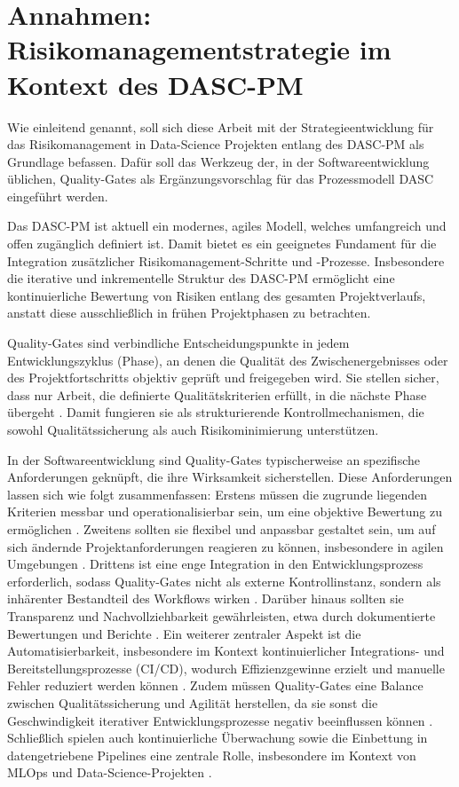\section{Annahmen: Risikomanagementstrategie im Kontext des DASC-PM}

Wie einleitend genannt, soll sich diese Arbeit mit der Strategieentwicklung für das Risikomanagement in Data-Science Projekten 
entlang des DASC-PM als Grundlage befassen.
Dafür soll das Werkzeug der, in der Softwareentwicklung üblichen, Quality-Gates als Ergänzungsvorschlag für das Prozessmodell 
DASC eingeführt werden.

Das DASC-PM ist aktuell ein modernes, agiles Modell, welches umfangreich und offen zugänglich definiert ist.
Damit bietet es ein geeignetes Fundament für die Integration zusätzlicher Risikomanagement-Schritte und -Prozesse.
Insbesondere die iterative und inkrementelle Struktur des DASC-PM ermöglicht eine kontinuierliche Bewertung von Risiken entlang 
des gesamten Projektverlaufs, anstatt diese ausschließlich in frühen Projektphasen zu betrachten.

Quality-Gates sind verbindliche Entscheidungspunkte in jedem Entwicklungszyklus (Phase), 
an denen die Qualität des Zwischenergebnisses oder des Projektfortschritts objektiv geprüft und freigegeben wird. 
Sie stellen sicher, dass nur Arbeit, die definierte Qualitätskriterien erfüllt, in die nächste Phase übergeht \citep{temole_integrated_2025}.
Damit fungieren sie als strukturierende Kontrollmechanismen, die sowohl Qualitätssicherung als auch Risikominimierung unterstützen.

In der Softwareentwicklung sind Quality-Gates typischerweise an spezifische Anforderungen geknüpft, die ihre Wirksamkeit sicherstellen.
Diese Anforderungen lassen sich wie folgt zusammenfassen:
Erstens müssen die zugrunde liegenden Kriterien messbar und operationalisierbar sein, um eine objektive Bewertung zu ermöglichen \citep{uzunova_quality_2024, paul_integrating_2025}.
Zweitens sollten sie flexibel und anpassbar gestaltet sein, um auf sich ändernde Projektanforderungen reagieren zu können, insbesondere in agilen Umgebungen \citep{uzunova_quality_2024}.
Drittens ist eine enge Integration in den Entwicklungsprozess erforderlich, sodass Quality-Gates nicht als externe Kontrollinstanz, 
sondern als inhärenter Bestandteil des Workflows wirken \citep{paul_integrating_2025}.
Darüber hinaus sollten sie Transparenz und Nachvollziehbarkeit gewährleisten, etwa durch dokumentierte Bewertungen und Berichte \citep{uzunova_quality_2024}.
Ein weiterer zentraler Aspekt ist die Automatisierbarkeit, insbesondere im Kontext kontinuierlicher Integrations- und 
Bereitstellungsprozesse (CI/CD), wodurch Effizienzgewinne erzielt und manuelle Fehler reduziert werden können \citep{paul_integrating_2025}.
Zudem müssen Quality-Gates eine Balance zwischen Qualitätssicherung und Agilität herstellen, da sie sonst die Geschwindigkeit iterativer Entwicklungsprozesse negativ beeinflussen können \citep{uzunova_quality_2024}.
Schließlich spielen auch kontinuierliche Überwachung sowie die Einbettung in datengetriebene Pipelines eine zentrale Rolle, 
insbesondere im Kontext von MLOps und Data-Science-Projekten \citep{nellutla1_mlops_2026}.

